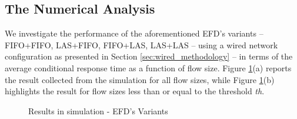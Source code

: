 \documentclass[preprint,12pt]{elsarticle}
\begin{document}
\subsection{The Numerical Analysis}
We investigate the performance of the aforementioned EFD's variants -- FIFO+FIFO, LAS+FIFO, FIFO+LAS, LAS+LAS -- using a wired network configuration as presented in Section \ref{sec:wired_methodology} -- in terms of the average conditional response time as a function of flow size. Figure \ref{fig:efd_variants}(a) reports the result collected from the simulation for all flow sizes, while Figure \ref{fig:efd_variants}(b) highlights the result for flow sizes less than or equal to the threshold \textit{th}. 

\begin{figure}[ht!]
  \centering
  \caption{Results in simulation - EFD's Variants}
  \label{fig:efd_variants}
\end{figure}
\end{document}
